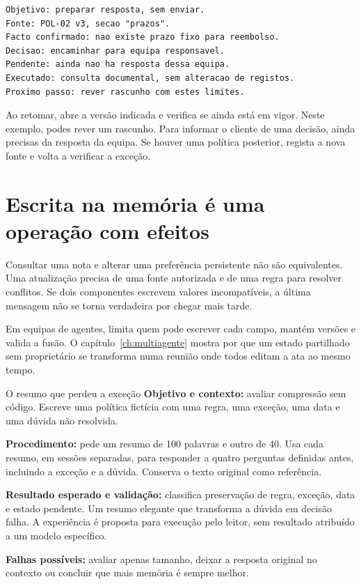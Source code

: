 \begin{lstlisting}
Objetivo: preparar resposta, sem enviar.
Fonte: POL-02 v3, secao "prazos".
Facto confirmado: nao existe prazo fixo para reembolso.
Decisao: encaminhar para equipa responsavel.
Pendente: ainda nao ha resposta dessa equipa.
Executado: consulta documental, sem alteracao de registos.
Proximo passo: rever rascunho com estes limites.
\end{lstlisting}

Ao retomar, abre a versão indicada e verifica se ainda está em vigor. Neste exemplo, podes rever um rascunho. Para informar o cliente de uma decisão, ainda precisas da resposta da equipa. Se houver uma política posterior, regista a nova fonte e volta a verificar a exceção.

\section{Escrita na memória é uma operação com efeitos}
Consultar uma nota e alterar uma preferência persistente não são equivalentes. Uma atualização precisa de uma fonte autorizada e de uma regra para resolver conflitos. Se dois componentes escrevem valores incompatíveis, a última mensagem não se torna verdadeira por chegar mais tarde.

Em equipas de agentes, limita quem pode escrever cada campo, mantém versões e valida a fusão. O capítulo~\ref{ch:multiagente} mostra por que um estado partilhado sem proprietário se transforma numa reunião onde todos editam a ata ao mesmo tempo.

\begin{promptlabbox}{O resumo que perdeu a exceção}
\textbf{Objetivo e contexto:} avaliar compressão sem código. Escreve uma política fictícia com uma regra, uma exceção, uma data e uma dúvida não resolvida.

\textbf{Procedimento:} pede um resumo de 100 palavras e outro de 40. Usa cada resumo, em sessões separadas, para responder a quatro perguntas definidas antes, incluindo a exceção e a dúvida. Conserva o texto original como referência.

\textbf{Resultado esperado e validação:} classifica preservação de regra, exceção, data e estado pendente. Um resumo elegante que transforma a dúvida em decisão falha. A experiência é proposta para execução pelo leitor, sem resultado atribuído a um modelo específico.

\textbf{Falhas possíveis:} avaliar apenas tamanho, deixar a resposta original no contexto ou concluir que mais memória é sempre melhor.
\end{promptlabbox}
